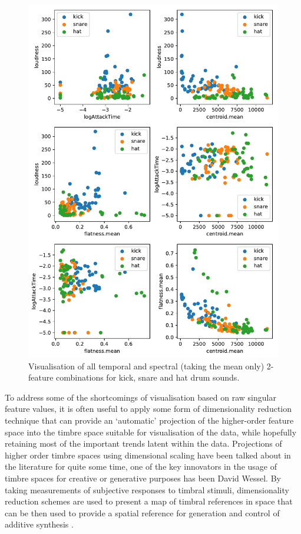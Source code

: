 \begin{figure}
	\begin{center}
		\includegraphics[width=1.0\textwidth]{ch06_rhythmcat/figures/feature_axis_combos.pdf}
	\end{center}
	\caption[Visualisation of all temporal and spectral feature combinations for kick, snare and hat drum sounds]{Visualisation of all temporal and spectral (taking the mean only) 2-feature combinations for kick, snare and hat drum sounds.}
	\label{fig:temporal_and_spectral_features}
\end{figure}


To address some of the shortcomings of visualisation based on raw singular feature values, it is often useful to apply some form of dimensionality reduction technique that can provide an `automatic' projection of the higher-order feature space into the timbre space suitable for visualisation of the data, while hopefully retaining most of the important trends latent within the data. Projections of higher order timbre spaces using dimensional scaling have been talked about in the literature for quite some time, one of the key innovators in the usage of timbre spaces for creative or generative purposes has been David Wessel. By taking measurements of subjective responses to timbral stimuli, dimensionality reduction schemes are used to present a map of timbral references in space that can be then used to provide a spatial reference for generation and control of additive synthesis \citep{Wessel1979, Wessel1976}.

